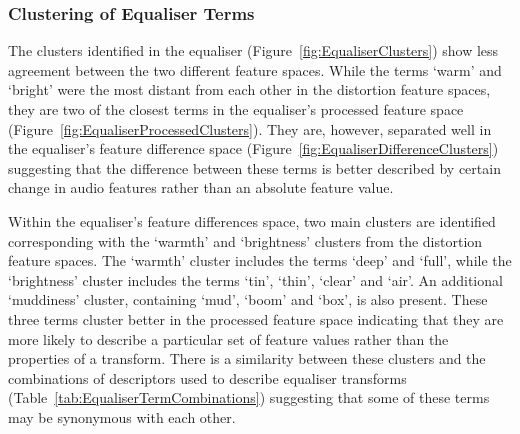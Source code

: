 		\subsubsection*{Clustering of Equaliser Terms}
			The clusters identified in the equaliser (Figure~\ref{fig:EqualiserClusters}) show less agreement
			between the two different feature spaces. While the terms `warm' and `bright' were the most distant
			from each other in the distortion feature spaces, they are two of the closest terms in the
			equaliser's processed feature space (Figure~\ref{fig:EqualiserProcessedClusters}). They are,
			however, separated well in the equaliser's feature difference space
			(Figure~\ref{fig:EqualiserDifferenceClusters}) suggesting that the difference between these terms
			is better described by certain change in audio features rather than an absolute feature value.
			
			Within the equaliser's feature differences space, two main clusters are identified corresponding
			with the `warmth' and `brightness' clusters from the distortion feature spaces. The `warmth'
			cluster includes the terms `deep' and `full', while the `brightness' cluster includes the terms
			`tin', `thin', `clear' and `air'. An additional `muddiness' cluster, containing `mud', `boom' and
			`box', is also present. These three terms cluster better in the processed feature space indicating
			that they are more likely to describe a particular set of feature values rather than the properties
			of a transform. There is a similarity between these clusters and the combinations of descriptors
			used to describe equaliser transforms (Table~\ref{tab:EqualiserTermCombinations}) suggesting that
			some of these terms may be synonymous with each other.

